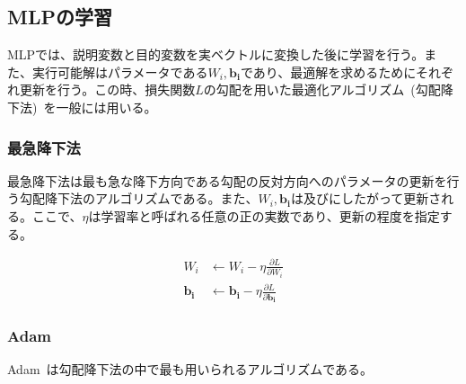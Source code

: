 \clearpage

\subsection{MLPの学習}

MLPでは、説明変数と目的変数を実ベクトルに変換した後に学習を行う。また、実行可能解はパラメータである$W_i,\boldsymbol{b_i}$であり、最適解を求めるためにそれぞれ更新を行う。この時、損失関数$L$の勾配を用いた最適化アルゴリズム~(勾配降下法)~を一般には用いる。

\subsubsection{最急降下法}

最急降下法は最も急な降下方向である勾配の反対方向へのパラメータの更新を行う勾配降下法のアルゴリズムである。また、$W_i,\boldsymbol{b_i}$は及びにしたがって更新される。ここで、$\eta$は学習率と呼ばれる任意の正の実数であり、更新の程度を指定する。

\begin{align}
    \label{eq:MLP2_0}
    W _i &\leftarrow W_i - \eta \frac{\partial L}{\partial W_i} \\
    \label{eq:MLP2_1}
    \boldsymbol{b _i} &\leftarrow \boldsymbol{b_i} - \eta \frac{\partial L}{\partial \boldsymbol{b_i}}
\end{align}

\subsubsection{Adam}
\label{sec:Adam}

Adam~\cite{Adam}は勾配降下法の中で最も用いられるアルゴリズムである。

